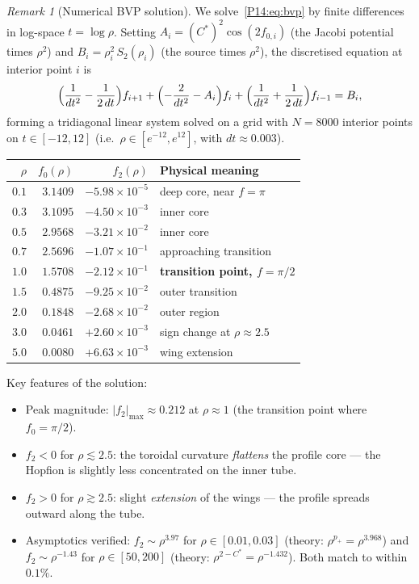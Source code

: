 \documentclass[11pt,a4paper]{article}
\theoremstyle{definition}
\theoremstyle{remark}
\newtheorem{remark}[theorem]{Remark}
\newcommand{\Cstar}{C^*}
\newcommand{\fzero}{f_0}
\newcommand{\ftwo}{f_2}
\newcommand{\Stwo}{S_2}
\begin{document}
\begin{remark}[Numerical BVP solution]
\label{P14:rem:numerical_solution}
We solve~\eqref{P14:eq:bvp} by finite differences in log-space $t=\log\rho$.
Setting $A_i = ({C^*})^2\cos(2f_{0,i})$ (the Jacobi potential times $\rho^2$)
and $B_i = \rho_i^2\,\Stwo(\rho_i)$ (the source times $\rho^2$),
the discretised equation at interior point $i$ is
\begin{equation}
  \Bigl(\frac{1}{dt^2}-\frac{1}{2\,dt}\Bigr)f_{i+1}
  + \Bigl(-\frac{2}{dt^2} - A_i\Bigr)f_i
  + \Bigl(\frac{1}{dt^2}+\frac{1}{2\,dt}\Bigr)f_{i-1}
  = B_i,
  \label{P14:eq:fd_scheme}
\end{equation}
forming a tridiagonal linear system solved on a grid with
$N=8000$ interior points on $t\in[-12,12]$
(i.e.\ $\rho\in[e^{-12},e^{12}]$, with $dt\approx0.003$).

\medskip
\begin{center}
\begin{tabular}{rrrl}
\toprule
$\rho$ & $\fzero(\rho)$ & $\ftwo(\rho)$ & Physical meaning \\
\midrule
$0.1$ & $3.1409$ & $-5.98\times10^{-5}$ & deep core, near $f=\pi$ \\
$0.3$ & $3.1095$ & $-4.50\times10^{-3}$ & inner core \\
$0.5$ & $2.9568$ & $-3.21\times10^{-2}$ & inner core \\
$0.7$ & $2.5696$ & $-1.07\times10^{-1}$ & approaching transition \\
$1.0$ & $1.5708$ & $-2.12\times10^{-1}$ & \textbf{transition point, $f=\pi/2$} \\
$1.5$ & $0.4875$ & $-9.25\times10^{-2}$ & outer transition \\
$2.0$ & $0.1848$ & $-2.68\times10^{-2}$ & outer region \\
$3.0$ & $0.0461$ & $+2.60\times10^{-3}$ & sign change at $\rho\approx2.5$ \\
$5.0$ & $0.0080$ & $+6.63\times10^{-3}$ & wing extension \\
\bottomrule
\end{tabular}
\end{center}
\medskip

Key features of the solution:
\begin{itemize}[noitemsep]
\item Peak magnitude: $|\ftwo|_{\max}\approx0.212$ at $\rho\approx1$
  (the transition point where $\fzero=\pi/2$).
\item $\ftwo<0$ for $\rho\lesssim2.5$: the toroidal curvature
  \emph{flattens} the profile core --- the Hopfion is slightly less
  concentrated on the inner tube.
\item $\ftwo>0$ for $\rho\gtrsim2.5$: slight \emph{extension} of the wings
  --- the profile spreads outward along the tube.
\item Asymptotics verified: $\ftwo\sim\rho^{3.97}$ for $\rho\in[0.01,0.03]$
  (theory: $\rho^{p_+}=\rho^{3.968}$)
  and $\ftwo\sim\rho^{-1.43}$ for $\rho\in[50,200]$
  (theory: $\rho^{2-\Cstar}=\rho^{-1.432}$).
  Both match to within $0.1\%$.
\end{itemize}
\end{remark}
\end{document}

